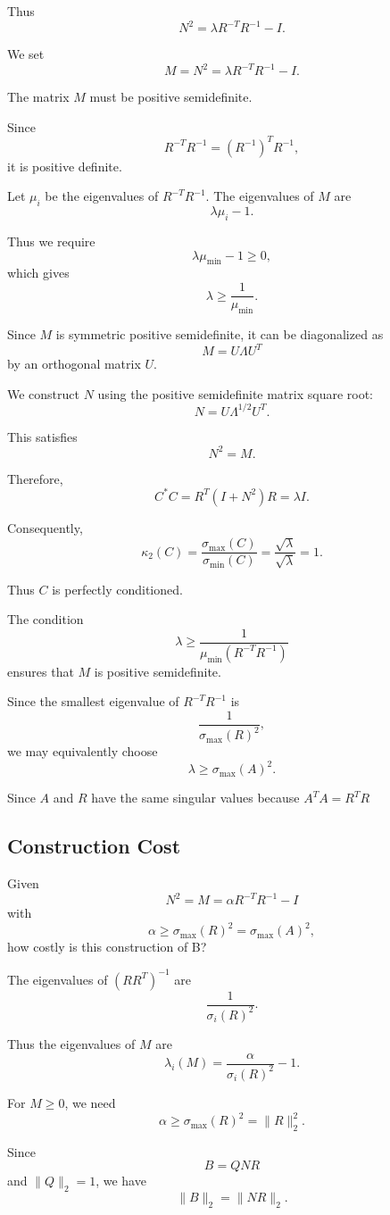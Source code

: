 \documentclass[11pt, reqno, a4paper]{amsart}
\theoremstyle{plain}
\theoremstyle{definition}
\theoremstyle{remark}
\numberwithin{equation}{section}
\begin{document}
Thus
\[
N^2=\lambda R^{-T}R^{-1}-I.
\]

We set
\[
M=N^2=\lambda R^{-T}R^{-1}-I.
\]

The matrix $M$ must be positive semidefinite.

Since
\[
R^{-T}R^{-1}=(R^{-1})^TR^{-1},
\]
it is positive definite.

Let $\mu_i$ be the eigenvalues of $R^{-T}R^{-1}$. The eigenvalues of $M$ are
\[
\lambda\mu_i-1.
\]

Thus we require
\[
\lambda\mu_{\min}-1\geq0,
\]
which gives
\[
\lambda\geq\frac{1}{\mu_{\min}}.
\]

Since $M$ is symmetric positive semidefinite, it can be diagonalized as
\[
M=U\Lambda U^T
\]
by an orthogonal matrix $U$.

We construct $N$ using the positive semidefinite matrix square root:
\[
N=U\Lambda^{1/2}U^T.
\]

This satisfies
\[
N^2=M.
\]

Therefore,
\[
C^*C
=
R^T(I+N^2)R
=
\lambda I.
\]

Consequently,
\[
\kappa_2(C)
=
\frac{\sigma_{\max}(C)}{\sigma_{\min}(C)}
=
\frac{\sqrt{\lambda}}{\sqrt{\lambda}}
=1.
\]

Thus $C$ is perfectly conditioned.

The condition
\[
\lambda\geq
\frac{1}{\mu_{\min}(R^{-T}R^{-1})}
\]
ensures that $M$ is positive semidefinite.

Since the smallest eigenvalue of $R^{-T}R^{-1}$ is
\[
\frac{1}{\sigma_{\max}(R)^2},
\]
we may equivalently choose
\[
\boxed{
\lambda\geq\sigma_{\max}(A)^2.
}
\]

Since $A$ and $R$ have the same singular values because $A^TA=R^TR$

\subsection{Construction Cost}

Given
\[
N^2=M=\alpha R^{-T}R^{-1}-I
\]
with
\[
\alpha\geq\sigma_{\max}(R)^2
=
\sigma_{\max}(A)^2,
\]
how costly is this construction of B?

The eigenvalues of $(RR^T)^{-1}$ are
\[
\frac{1}{\sigma_i(R)^2}.
\]

Thus the eigenvalues of $M$ are
\[
\lambda_i(M)
=
\frac{\alpha}{\sigma_i(R)^2}-1.
\]

For $M\geq0$, we need
\[
\alpha\geq\sigma_{\max}(R)^2
=
\|R\|_2^2.
\]

Since
\[
B=QNR
\]
and $\|Q\|_2=1$, we have
\[
\|B\|_2=\|NR\|_2.
\]
\end{document}
